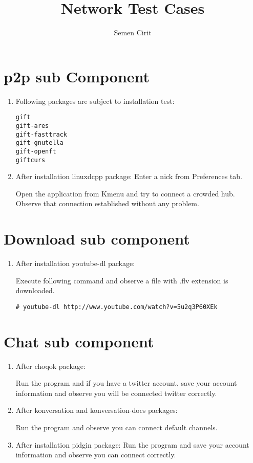 \documentclass[a4paper,10pt]{article}
\title{Network Test Cases}
\author{Semen Cirit}
\begin{document}
\maketitle
\section{p2p sub Component}
\begin{enumerate}
 \item Following packages are subject to installation test:

\begin{verbatim}
gift
gift-ares
gift-fasttrack
gift-gnutella
gift-openft
giftcurs
\end{verbatim}

 \item After installation linuxdcpp package:
Enter a nick from Preferences tab. 

Open the application from Kmenu and try to connect a crowded hub. Observe that connection established without any problem.
\end{enumerate}
\section{Download sub component}
\begin{enumerate}
 \item After installation youtube-dl package:

Execute following command and observe a file with .flv extension is downloaded.
\begin{verbatim}
# youtube-dl http://www.youtube.com/watch?v=5u2q3P60XEk
\end{verbatim}

\end{enumerate}

\section{Chat sub component}
\begin{enumerate}
\item After choqok package:

Run the program and if you have a twitter account, save your account information and observe you will be connected twitter correctly.	
\item After konversation and konversation-docs packages:

Run the program and observe you can connect default channels.

\item After installation pidgin package:
Run the program and save your account information and observe you can connect correctly.

\end{enumerate}
\end{document}
